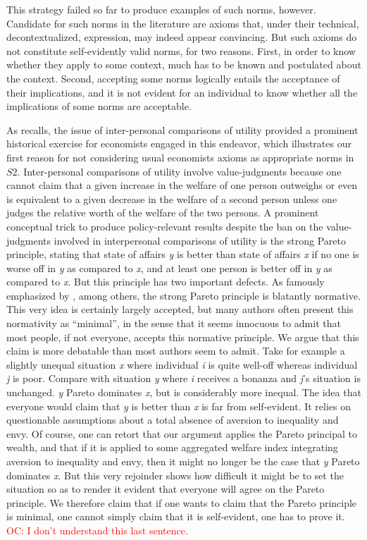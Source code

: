 \documentclass[preprint, french, english, 11pt, authoryear]{elsarticle}%
\newcommand{\commentOC}[1]{\textcolor{red}{OC: #1}}
\begin{document}
This strategy failed so far to produce examples of such norms, however. Candidate for such norms in the literature are axioms that, under their technical, decontextualized, expression, may indeed appear convincing. But such axioms do not constitute self-evidently valid norms, for two reasons. First, in order to know whether they apply to some context, much has to be known and postulated about the context. Second, accepting some norms logically entails the acceptance of their implications, and it is not evident for an individual to know whether all the implications of some norms are acceptable.

As \cite{baujard_leconomie_2011} recalls, the issue of inter-personal comparisons of utility provided a prominent historical exercise for economists engaged in this endeavor, which illustrates our first reason for not considering usual economists axioms as appropriate norms in $S2$. Inter-personal comparisons of utility involve value-judgments because one cannot claim that a given increase in the welfare of one person outweighs or even is equivalent to a given decrease in the welfare of a second person unless one judges the relative worth of the welfare of the two persons. A prominent conceptual trick to produce policy-relevant results despite the ban on the value-judgments involved in interpersonal comparisons of utility is the strong Pareto principle, stating that state of affairs \emph{y} is better than state of affairs \emph{x} if no one is worse off in \emph{y} as compared to \emph{x}, and at least one person is better off in \emph{y} as compared to \emph{x}. But this principle has two important defects. As famously emphasized by \cite{sen_rationality_2004}, among others, the strong Pareto principle is blatantly normative. This very idea is certainly largely accepted, but many authors often present this normativity as ``minimal'', in the sense that it seems innocuous to admit that most people, if not everyone, accepts this normative principle. We argue that this claim is more debatable than most authors seem to admit. Take for example a slightly unequal situation \emph{x} where individual \emph{i} is quite well-off whereas individual \emph{j} is poor. Compare with situation \emph{y} where \emph{i} receives a bonanza and \emph{j}'s situation is unchanged. \emph{y} Pareto dominates \emph{x}, but is considerably more inequal. The idea that everyone would claim that \emph{y} is better than \emph{x} is far from self-evident. It relies on questionable assumptions about a total absence of aversion to inequality and envy. Of course, one can retort that our argument applies the Pareto principal to wealth, and that if it is applied to some aggregated welfare index integrating aversion to inequality and envy, then it might no longer be the case that \emph{y} Pareto dominates \emph{x}. But this very rejoinder shows how difficult it might be to set the situation so as to render it evident that everyone will agree on the Pareto principle. We therefore claim that if one wants to claim that the Pareto principle is minimal, one cannot simply claim that it is self-evident, one has to prove it. \commentOC{I don’t understand this last sentence.}
\end{document}
